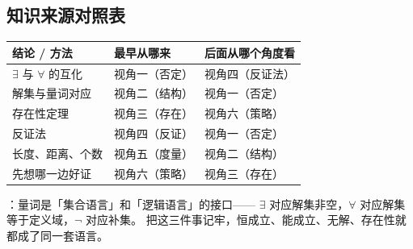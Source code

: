 \begin{afterclass}
\subsection{知识来源对照表}
\begin{center}
\footnotesize
\setlength{\tabcolsep}{4pt}
\renewcommand{\arraystretch}{1.35}
\begin{tabular}{p{3.4cm}p{4.0cm}p{5.6cm}}
\toprule
结论 / 方法 & 最早从哪来 & 后面从哪个角度看 \\
\midrule
$\exists$ 与 $\forall$ 的互化 & 视角一（否定） & 视角四（反证法） \\
解集与量词对应 & 视角二（结构） & 视角一（否定） \\
存在性定理 & 视角三（存在） & 视角六（策略） \\
反证法 & 视角四（反证） & 视角一（否定） \\
长度、距离、个数 & 视角五（度量） & 视角二（结构） \\
先想哪一边好证 & 视角六（策略） & 视角三（存在） \\
\bottomrule
\end{tabular}
\end{center}

：量词是「集合语言」和「逻辑语言」的接口——
$\exists$ 对应解集非空，$\forall$ 对应解集等于定义域，$\neg$ 对应补集。
把这三件事记牢，恒成立、能成立、无解、存在性就都成了同一套语言。
\end{afterclass}
